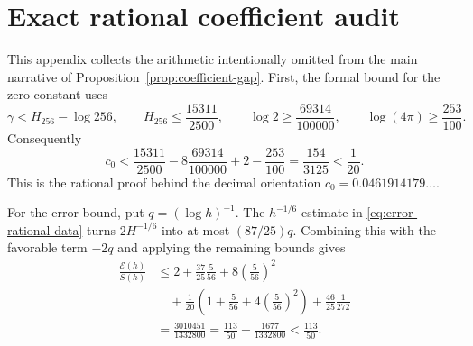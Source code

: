 \documentclass[11pt]{amsart}
\theoremstyle{definition}
\theoremstyle{remark}
\numberwithin{equation}{section}
\newcommand{\euler}{\gamma}
\newcommand{\E}{\mathcal{E}}
\begin{document}
\section{Exact rational coefficient audit}\label{app:coefficients}

This appendix collects the arithmetic intentionally omitted from the main
narrative of Proposition~\ref{prop:coefficient-gap}.  First, the formal bound
for the zero constant uses
\[
 \euler<H_{256}-\log256,\qquad
 H_{256}\le\frac{15311}{2500},\qquad
 \log2\ge\frac{69314}{100000},\qquad
 \log(4\pi)\ge\frac{253}{100}.
\]
Consequently
\[
 c_0<
 \frac{15311}{2500}-8\frac{69314}{100000}
 +2-\frac{253}{100}
 =\frac{154}{3125}<\frac1{20}.
\]
This is the rational proof behind the decimal orientation
$c_0=0.0461914179\ldots$.

For the error bound, put $q=(\log h)^{-1}$.  The
$h^{-1/6}$ estimate in \eqref{eq:error-rational-data} turns
$2H^{-1/6}$ into at most $(87/25)q$.  Combining this with the favorable
term $-2q$ and applying the remaining bounds gives
\begin{align*}
 \frac{\E(h)}{S(h)}
 &\le
 2+\frac{37}{25}\frac5{56}
 +8\left(\frac5{56}\right)^2\\
 &\quad+\frac1{20}
   \left(1+\frac5{56}+4\left(\frac5{56}\right)^2\right)
 +\frac{46}{25}\frac1{272}\\
 &=\frac{3010451}{1332800}
 =\frac{113}{50}-\frac{1677}{1332800}
 <\frac{113}{50}.
\end{align*}
\end{document}
